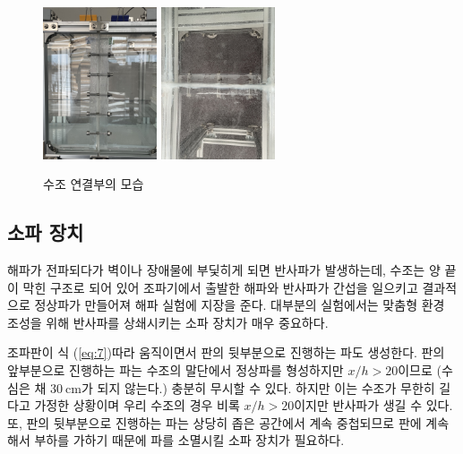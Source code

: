 \begin{figure}[h]
	\begin{center}
		\includegraphics[width=0.3\textwidth]{images/magam1.jpg}
		\includegraphics[width=0.3\textwidth]{images/magam2.jpg}
		\caption{수조 연결부의 모습}
		\label{Waveabsorber}
	\end{center}
\end{figure}

\subsection{소파 장치}
해파가 전파되다가 벽이나 장애물에 부딫히게 되면 반사파가 발생하는데, 수조는 양 끝이 막힌 구조로 되어 있어 조파기에서 출발한 해파와 반사파가 간섭을 일으키고 결과적으로 정상파가 만들어져 해파 실험에 지장을 준다. 대부분의 실험에서는 맞춤형 환경 조성을 위해 반사파를 상쇄시키는 소파 장치가 매우 중요하다.

조파판이 식 (\ref{eq:7})\을 따라 움직이면서 판의 뒷부분으로 진행하는 파도 생성한다. 판의 앞부분으로 진행하는 파는 수조의 말단에서 정상파를 형성하지만 $x/h > 20$이므로 (수심은 채 $30\mathrm{~cm}$가 되지 않는다.) 충분히 무시할 수 있다. 하지만 이는 수조가 무한히 길다고 가정한 상황이며 우리 수조의 경우 비록 $x/h > 20$이지만 반사파가 생길 수 있다. 또, 판의 뒷부분으로 진행하는 파는 상당히 좁은 공간에서 계속 중첩되므로 판에 계속해서 부하를 가하기 때문에 파를 소멸시킬 소파 장치가 필요하다.

